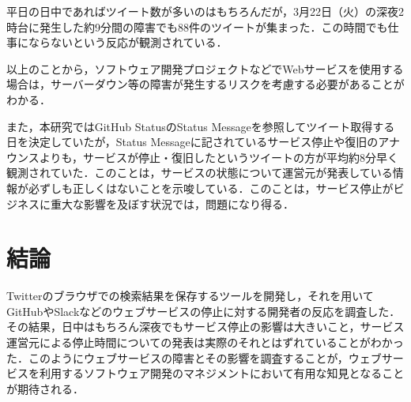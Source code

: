 \documentclass[uplatex,twocolumn]{jsarticle}
\begin{document}
平日の日中であればツイート数が多いのはもちろんだが，3月22日（火）の深夜2時台に発生した約9分間の障害でも88件のツイートが集まった．この時間でも仕事にならないという反応が観測されている．

以上のことから，ソフトウェア開発プロジェクトなどでWebサービスを使用する場合は，サーバーダウン等の障害が発生するリスクを考慮する必要があることがわかる．

また，本研究ではGitHub StatusのStatus Messageを参照してツイート取得する日を決定していたが，Status Messageに記されているサービス停止や復旧のアナウンスよりも，サービスが停止・復旧したというツイートの方が平均約8分早く観測されていた．このことは，サービスの状態について運営元が発表している情報が必ずしも正しくはないことを示唆している．このことは，サービス停止がビジネスに重大な影響を及ぼす状況では，問題になり得る．

\section{結論}
Twitterのブラウザでの検索結果を保存するツールを開発し，それを用いてGitHubやSlackなどのウェブサービスの停止に対する開発者の反応を調査した．その結果，日中はもちろん深夜でもサービス停止の影響は大きいこと，サービス運営元による停止時間についての発表は実際のそれとはずれていることがわかった．このようにウェブサービスの障害とその影響を調査することが，ウェブサービスを利用するソフトウェア開発のマネジメントにおいて有用な知見となることが期待される．

\end{document}
